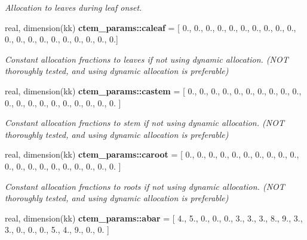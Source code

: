 \begin{DoxyCompactItemize}
\begin{DoxyCompactList}\small\item\em Allocation to leaves during leaf onset. \end{DoxyCompactList}\item 
\hypertarget{namespacectem__params_a593225b4810a8b566176f0ada4a2ad7a}{}real, dimension(kk) {\bfseries ctem\+\_\+params\+::caleaf} = \mbox{[} 0., 0., 0., 0., 0., 0., 0., 0., 0., 0., 0., 0., 0., 0., 0., 0., 0., 0., 0., 0.\mbox{]}\label{namespacectem__params_a593225b4810a8b566176f0ada4a2ad7a}

\begin{DoxyCompactList}\small\item\em Constant allocation fractions to leaves if not using dynamic allocation. (N\+O\+T thoroughly tested, and using dynamic allocation is preferable) \end{DoxyCompactList}\item 
\hypertarget{namespacectem__params_aa2fad05936bda6d7d58531f2a19d1b7b}{}real, dimension(kk) {\bfseries ctem\+\_\+params\+::castem} = \mbox{[} 0., 0., 0., 0., 0., 0., 0., 0., 0., 0., 0., 0., 0., 0., 0., 0., 0., 0., 0., 0. \mbox{]}\label{namespacectem__params_aa2fad05936bda6d7d58531f2a19d1b7b}

\begin{DoxyCompactList}\small\item\em Constant allocation fractions to stem if not using dynamic allocation. (N\+O\+T thoroughly tested, and using dynamic allocation is preferable) \end{DoxyCompactList}\item 
\hypertarget{namespacectem__params_a80eaaf9535291c9113cb1014eea91ca6}{}real, dimension(kk) {\bfseries ctem\+\_\+params\+::caroot} = \mbox{[} 0., 0., 0., 0., 0., 0., 0., 0., 0., 0., 0., 0., 0., 0., 0., 0., 0., 0., 0., 0. \mbox{]}\label{namespacectem__params_a80eaaf9535291c9113cb1014eea91ca6}

\begin{DoxyCompactList}\small\item\em Constant allocation fractions to roots if not using dynamic allocation. (N\+O\+T thoroughly tested, and using dynamic allocation is preferable) \end{DoxyCompactList}\item 
\hypertarget{namespacectem__params_a80132ab7ebb5d63e27978d1a13df0b80}{}real, dimension(kk) {\bfseries ctem\+\_\+params\+::abar} = \mbox{[} 4., 5., 0., 0., 0., 3., 3., 3., 8., 9., 3., 3., 0., 0., 0., 5., 4., 9., 0., 0. \mbox{]}\label{namespacectem__params_a80132ab7ebb5d63e27978d1a13df0b80}


\end{DoxyCompactItemize}
